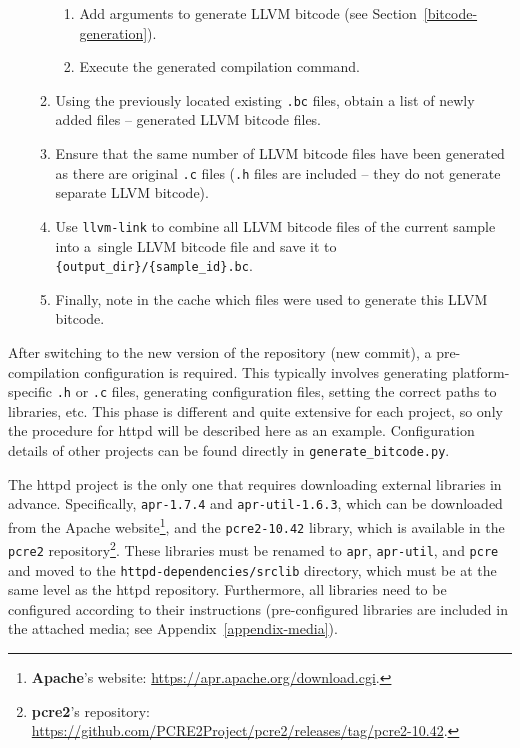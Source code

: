\begin{enumerate}
\begin{enumerate}
\begin{enumerate}
            \item Add arguments to generate LLVM bitcode (see Section~\ref{bitcode-generation}).
            \item Execute the generated compilation command.
        \end{enumerate}
        \item Using the previously located existing \texttt{.bc} files, obtain a list of newly added files -- generated LLVM bitcode files.
        \item Ensure that the same number of LLVM bitcode files have been generated as there are original \texttt{.c} files (\texttt{.h} files are included -- they do not generate separate LLVM bitcode).
        \item Use \texttt{llvm-link} to combine all LLVM bitcode files of the current sample into a~single LLVM bitcode file and save it to \texttt{\{output\_dir\}/\{sample\_id\}.bc}.
        \item Finally, note in the cache which files were used to generate this LLVM bitcode.
    \end{enumerate}
\end{enumerate}

After switching to the new version of the repository (new commit), a pre-compilation configuration is required. This typically involves generating platform-specific \texttt{.h} or \texttt{.c} files, generating configuration files, setting the correct paths to libraries, etc. This phase is different and quite extensive for each project, so only the procedure for httpd will be described here as an example. Configuration details of other projects can be found directly in \texttt{generate\_bitcode.py}.

The httpd project is the only one that requires downloading external libraries in advance. Specifically, \texttt{apr-1.7.4} and \texttt{apr-util-1.6.3}, which can be downloaded from the Apache website\footnote{\textbf{Apache}'s website: \url{https://apr.apache.org/download.cgi}.}, and the \texttt{pcre2-10.42} library, which is available in the \texttt{pcre2} repository\footnote{\textbf{pcre2}'s repository: \url{https://github.com/PCRE2Project/pcre2/releases/tag/pcre2-10.42}.}. These libraries must be renamed to \texttt{apr}, \texttt{apr-util}, and \texttt{pcre} and moved to the \texttt{httpd-dependencies/srclib} directory, which must be at the same level as the httpd repository. Furthermore, all libraries need to be configured according to their instructions (pre-configured libraries are included in the attached media; see Appendix~\ref{appendix-media}).

